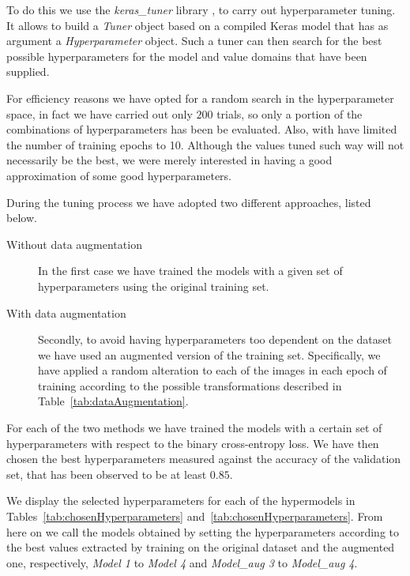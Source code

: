 
   
To do this we use the \textit{keras\_tuner} library \cite{omalley2019kerastuner}, to carry out hyperparameter tuning. It allows to build a \textit{Tuner} object based on a compiled Keras model that has as argument a \textit{Hyperparameter} object. Such a tuner can then search for the best possible hyperparameters for the model and value domains that have been supplied. 

For efficiency reasons we have opted for a random search in the hyperparameter space, in fact we have carried out only $200$ trials, so only a portion of the combinations of hyperparameters has been be evaluated. Also, with have limited the number of training epochs to 10. Although the values tuned such way will not necessarily be the best, we were merely interested in having a good approximation of some good hyperparameters.

During the tuning process we have adopted two different approaches, listed below. 
\begin{description}
    \item[Without data augmentation]  In the first case we have trained the models with a given set of hyperparameters using the original training set.
    \item[With data augmentation]  Secondly, to avoid having hyperparameters too dependent on the dataset we have used an augmented version of the training set. Specifically, we have applied a random alteration to each of the images in each epoch of training according to the possible transformations described in Table~\ref{tab:dataAugmentation}.
\end{description}

For each of the two methods we have trained the models with a certain set of hyperparameters with respect to the binary cross-entropy loss. We have then chosen the best hyperparameters measured against the accuracy of the validation set, that has been observed to be at least $0.85$. 

We display the selected hyperparameters for each of the hypermodels in Tables~\ref{tab:chosenHyperparameters} and~\ref{tab:chosenHyperparameters}. From here on we call the models obtained by setting the hyperparameters according to the best values extracted by training on the original dataset and the augmented one, respectively, \textsl{Model 1} to \textsl{Model 4} and \textsl{Model\_aug 3} to \textsl{Model\_aug 4}.








